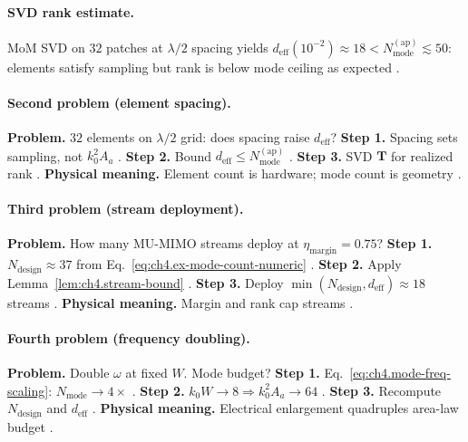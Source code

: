 \paragraph{SVD rank estimate.}
MoM SVD on \(32\) patches at \(\lambda/2\) spacing yields \(d_{\mathrm{eff}}(10^{-2})\approx18<N_{\mathrm{mode}}^{\mathrm{(ap)}}\lesssim50\): elements satisfy
sampling but rank is below mode ceiling as expected \cite{harrington2001,hansen1988,devaney2004,stratton1941,collin2001,jackson1999}.

\paragraph{Second problem (element spacing).}
\textbf{Problem.} \(32\) elements on \(\lambda/2\) grid: does spacing raise \(d_{\mathrm{eff}}\)?
\textbf{Step 1.} Spacing sets sampling, not \(k_{0}^{2}A_{a}\) \cite{collin2001,jackson1999,harrington2001}.
\textbf{Step 2.} Bound \(d_{\mathrm{eff}}\le N_{\mathrm{mode}}^{\mathrm{(ap)}}\) \cite{hansen1988,stratton1941,devaney2004}.
\textbf{Step 3.} SVD \(\mathbf{T}\) for realized rank \cite{harrington2001,jackson1999}.
\textbf{Physical meaning.} Element count is hardware; mode count is geometry \cite{stratton1941,collin2001}.

\paragraph{Third problem (stream deployment).}
\textbf{Problem.} How many MU-MIMO streams deploy at \(\eta_{\mathrm{margin}}=0.75\)?
\textbf{Step 1.} \(N_{\mathrm{design}}\approx37\) from Eq.~\eqref{eq:ch4.ex-mode-count-numeric} \cite{harrington2001,collin2001}.
\textbf{Step 2.} Apply Lemma~\ref{lem:ch4.stream-bound} \cite{devaney2004,hansen1988,stratton1941}.
\textbf{Step 3.} Deploy \(\min(N_{\mathrm{design}},d_{\mathrm{eff}})\approx18\) streams \cite{jackson1999,harrington2001}.
\textbf{Physical meaning.} Margin and rank cap streams \cite{stratton1941,devaney2004}.

\paragraph{Fourth problem (frequency doubling).}
\textbf{Problem.} Double \(\omega\) at fixed \(W\). Mode budget?
\textbf{Step 1.} Eq.~\eqref{eq:ch4.mode-freq-scaling}: \(N_{\mathrm{mode}}\to4\times\) \cite{jackson1999,hansen1988,collin2001,harrington2001}.
\textbf{Step 2.} \(k_{0}W\to8\Rightarrow k_{0}^{2}A_{a}\to64\) \cite{stratton1941,devaney2004}.
\textbf{Step 3.} Recompute \(N_{\mathrm{design}}\) and \(d_{\mathrm{eff}}\) \cite{harrington2001,jackson1999}.
\textbf{Physical meaning.} Electrical enlargement quadruples area-law budget \cite{hansen1988,collin2001}.

